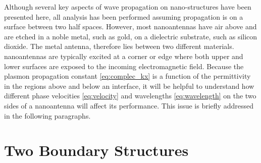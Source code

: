 \documentclass[11pt]{article}
\begin{document}
Although several key aspects of wave propagation on nano-structures have been presented here, all analysis has been performed assuming propagation is on a surface between two half spaces. However, most nanoantennas have air above and are etched in a noble metal, such as gold, on a dielectric substrate, such as silicon dioxide. The metal antenna, therefore lies between two different materials. nanoantennas are typically excited at a corner or edge where both upper and lower surfaces are exposed to the incoming electromagnetic field. Because the plasmon propagation constant \eqref{eq:complec_kx} is a function of the permittivity in the regions above and below an interface, it will be helpful to understand how different phase velocities \eqref{eq:velocity} and wavelengths \eqref{eq:wavelength} on the two sides of a nanoantenna will affect its performance. This issue is briefly addressed in the following paragraphs.

\section{Two Boundary Structures}
\end{document}
